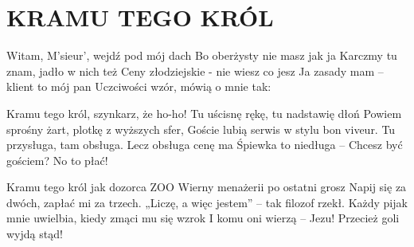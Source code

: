 \documentclass[../../../songbook.tex]{subfiles}
\begin{document}
\TabPositions{8cm} %
\section*{KRAMU TEGO KRÓL}
{}
\vspace{0.5cm}

{\tiny
Witam, M’sieur', wejdź pod mój dach		 \newline
Bo oberżysty nie masz jak ja			 \newline
Karczmy tu znam, jadło w nich też		 \newline
Ceny złodziejskie - nie wiesz co jesz	 \newline
Ja zasady mam – klient to mój pan		 \newline
Uczciwości wzór, mówią o mnie tak:		 \newline

Kramu tego król, szynkarz, że ho-ho!					 \newline
Tu uścisnę rękę, tu nadstawię dłoń						 \newline
Powiem sprośny żart, plotkę z wyższych sfer,			 \newline
Goście lubią serwis w stylu bon viveur.					 \newline
Tu przysługa, tam obsługa. Lecz obsługa cenę ma			 \newline
Śpiewka to niedługa – Chcesz być gościem? No to płać!	 \newline

Kramu tego król jak dozorca ZOO							 \newline
Wierny menażerii po ostatni grosz						 \newline
Napij się za dwóch, zapłać mi za trzech.				 \newline
„Liczę, a więc jestem” – tak filozof rzekł.				 \newline
Każdy pijak mnie uwielbia, kiedy zmąci mu się wzrok		 \newline
I komu oni wierzą – Jezu! Przecież goli wyjdą stąd!		 \newline

}
\end{document}
